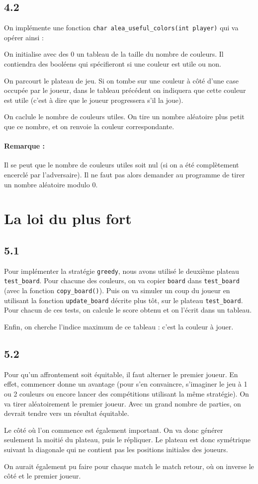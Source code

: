 \documentclass[12pt]{article}
\def\question#1{\subsection*{#1}}
\def\sec#1{\section{#1}}
\begin{document}
\question{4.2}
On implémente une fonction \texttt{char alea\_useful\_colors(int player)} qui va opérer ainsi :

On initialise avec des 0 un tableau de la taille du nombre de couleurs. Il contiendra des booléens qui spécifieront si une couleur est utile ou non.

On parcourt le plateau de jeu. Si on tombe sur une couleur à côté d'une case occupée par le joueur, dans le tableau précédent on indiquera que cette couleur est utile (c'est à dire que le joueur progressera s'il la joue).

On caclule le nombre de couleurs utiles. On tire un nombre aléatoire plus petit que ce nombre, et on renvoie la couleur correspondante.

\paragraph{Remarque :} Il se peut que le nombre de couleurs utiles soit nul (si on a été complètement encerclé par l'adversaire). Il ne faut pas alors demander au programme de tirer un nombre aléatoire modulo 0.

\sec{La loi du plus fort}
\question{5.1}
Pour implémenter la stratégie \texttt{greedy}, nous avons utilisé le deuxième plateau \texttt{test\_board}.
Pour chacune des couleurs, on va copier \texttt{board} dans \texttt{test\_board} (avec la fonction \texttt{copy\_board()}). Puis on va simuler un coup du joueur en utilisant la fonction \texttt{update\_board} décrite plus tôt, sur le plateau \texttt{test\_board}. Pour chacun de ces tests, on calcule le score obtenu et on l'écrit dans un tableau.

Enfin, on cherche l'indice maximum de ce tableau : c'est la couleur à jouer.


\question{5.2}
Pour qu'un affrontement soit équitable, il faut alterner le premier joueur. En effet, commencer donne un avantage (pour s'en convaincre, s'imaginer le jeu à 1 ou 2 couleurs ou encore lancer des compétitions utilisant la même stratégie). On va tirer aléatoirement le premier joueur. Avec un grand nombre de parties, on devrait tendre vers un résultat équitable.

Le côté où l'on commence est également important. On va donc générer seulement la moitié du plateau, puis le répliquer. Le plateau est donc symétrique suivant la diagonale qui ne contient pas les positions initiales des joueurs.

On aurait également pu faire pour chaque match le match retour, où on inverse le côté et le premier joueur.
\end{document}
